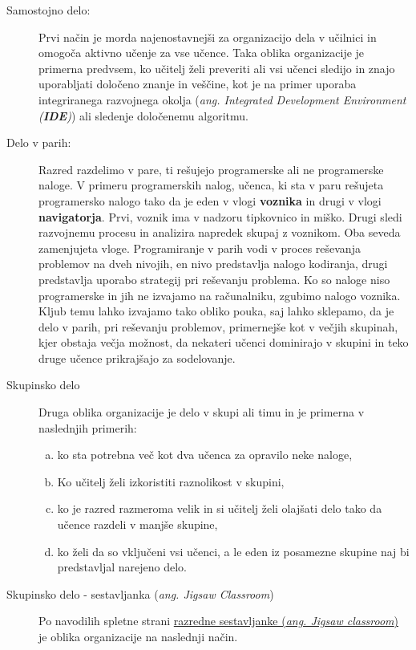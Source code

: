 \begin{description}
\item[Samostojno delo:] Prvi način je morda najenostavnejši
  za organizacijo dela v učilnici in omogoča aktivno učenje za vse
  učence. Taka oblika organizacije je primerna predvsem, ko učitelj
  želi preveriti ali vsi učenci sledijo in znajo uporabljati določeno
  znanje in veščine, kot je na primer uporaba integriranega razvojnega
  okolja (\emph{ang. Integrated Development Environment
    (\textbf{IDE})}) ali sledenje določenemu algoritmu.
\item[Delo v parih:] Razred razdelimo v pare, ti rešujejo
  programerske ali ne programerske naloge. V primeru programerskih
  nalog, učenca, ki sta v paru rešujeta programersko nalogo tako da je
  eden v vlogi \textbf{voznika} in drugi v vlogi
  \textbf{navigatorja}. Prvi, voznik ima v nadzoru tipkovnico in
  miško. Drugi sledi razvojnemu procesu in analizira napredek skupaj z
  voznikom. Oba seveda zamenjujeta vloge. Programiranje v parih vodi v
  proces reševanja problemov na dveh nivojih, en nivo predstavlja
  nalogo kodiranja, drugi predstavlja uporabo strategij pri reševanju
  problema. Ko so naloge niso programerske in jih ne izvajamo na
  računalniku, zgubimo nalogo voznika. Kljub temu lahko izvajamo tako
  obliko pouka, saj lahko sklepamo, da je delo v parih, pri reševanju
  problemov, primernejše kot v večjih skupinah, kjer obstaja večja
  možnost, da nekateri učenci dominirajo v skupini in teko druge
  učence prikrajšajo za sodelovanje.
\item[Skupinsko delo] Druga oblika organizacije je delo v
  skupi ali timu in je primerna v naslednjih primerih:
  \begin{enumerate}[a.]
  \item ko sta potrebna več kot dva učenca za opravilo neke naloge,
  \item Ko učitelj želi izkoristiti raznolikost v skupini,
  \item ko je razred razmeroma velik in si učitelj želi olajšati delo
    tako da učence razdeli v manjše skupine,
  \item ko želi da so vključeni vsi učenci, a le eden iz posamezne
    skupine naj bi predstavljal narejeno delo.
  \end{enumerate}
\item[Skupinsko delo - sestavljanka (\emph{ang. Jigsaw Classroom})] Po
  navodilih spletne strani \href{https://www.jigsaw.org/}{razredne
    sestavljanke (\emph{ang. Jigsaw classroom})} je oblika
  organizacije na naslednji način.

\end{description}
